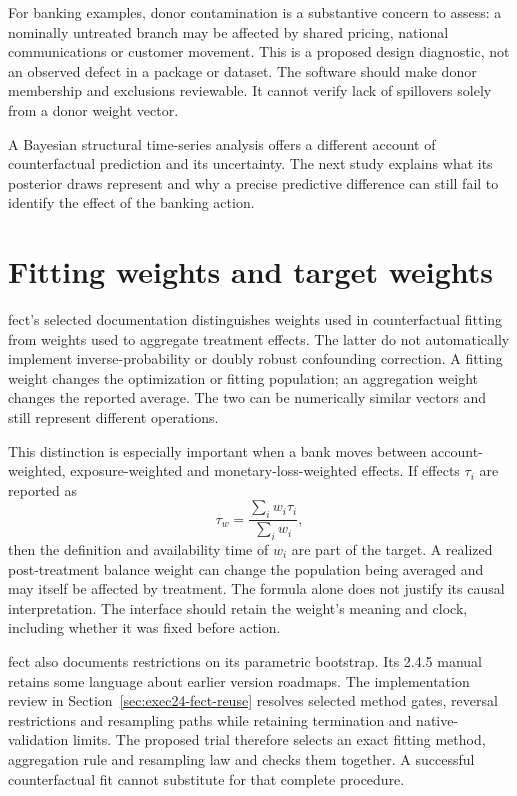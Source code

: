 For banking examples, donor contamination is a substantive concern to assess:
a nominally untreated branch may be affected by shared pricing, national
communications or customer movement. This is a proposed design diagnostic,
not an observed defect in a package or dataset. The software should make donor
membership and exclusions reviewable. It cannot verify lack of spillovers
solely from a donor weight vector.

A Bayesian structural time-series analysis offers a different account of
counterfactual prediction and its uncertainty. The next study explains what
its posterior draws represent and why a precise predictive difference can
still fail to identify the effect of the banking action.



\section{Fitting weights and target weights}

fect's selected documentation distinguishes weights used in counterfactual
fitting from weights used to aggregate treatment effects. The latter do not
automatically implement inverse-probability or doubly robust confounding
correction. A fitting weight changes the optimization or fitting population;
an aggregation weight changes the reported average. The two can be numerically
similar vectors and still represent different operations. \citep{v12_sw_fect}

This distinction is especially important when a bank moves between
account-weighted, exposure-weighted and monetary-loss-weighted effects.
If effects \(\tau_i\) are reported as
\[
 \tau_w=\frac{\sum_i w_i\tau_i}{\sum_i w_i},
\]
then the definition and availability time of \(w_i\) are part of the target.
A realized post-treatment balance weight can change the population being
averaged and may itself be affected by treatment. The formula alone does not
justify its causal interpretation. The interface should retain the weight's
meaning and clock, including whether it was fixed before action.

fect also documents restrictions on its parametric bootstrap. Its 2.4.5
manual retains some language about earlier version roadmaps. The implementation
review in Section~\ref{sec:exec24-fect-reuse} resolves selected method gates,
reversal restrictions and resampling paths while retaining termination and
native-validation limits. The proposed trial therefore selects an exact fitting
method, aggregation rule and resampling law and checks them together. A
successful counterfactual fit cannot substitute for that complete procedure.

